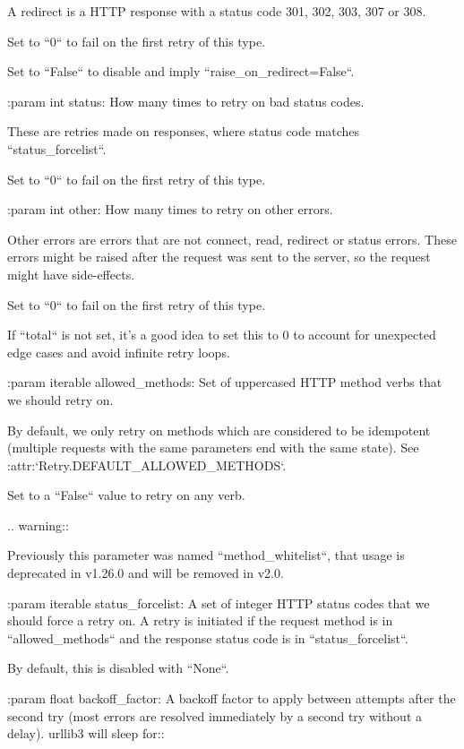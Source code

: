 \begin{DoxyVerb}
    A redirect is a HTTP response with a status code 301, 302, 303, 307 or
    308.

    Set to ``0`` to fail on the first retry of this type.

    Set to ``False`` to disable and imply ``raise_on_redirect=False``.

:param int status:
    How many times to retry on bad status codes.

    These are retries made on responses, where status code matches
    ``status_forcelist``.

    Set to ``0`` to fail on the first retry of this type.

:param int other:
    How many times to retry on other errors.

    Other errors are errors that are not connect, read, redirect or status errors.
    These errors might be raised after the request was sent to the server, so the
    request might have side-effects.

    Set to ``0`` to fail on the first retry of this type.

    If ``total`` is not set, it's a good idea to set this to 0 to account
    for unexpected edge cases and avoid infinite retry loops.

:param iterable allowed_methods:
    Set of uppercased HTTP method verbs that we should retry on.

    By default, we only retry on methods which are considered to be
    idempotent (multiple requests with the same parameters end with the
    same state). See :attr:`Retry.DEFAULT_ALLOWED_METHODS`.

    Set to a ``False`` value to retry on any verb.

    .. warning::

        Previously this parameter was named ``method_whitelist``, that
        usage is deprecated in v1.26.0 and will be removed in v2.0.

:param iterable status_forcelist:
    A set of integer HTTP status codes that we should force a retry on.
    A retry is initiated if the request method is in ``allowed_methods``
    and the response status code is in ``status_forcelist``.

    By default, this is disabled with ``None``.

:param float backoff_factor:
    A backoff factor to apply between attempts after the second try
    (most errors are resolved immediately by a second try without a
    delay). urllib3 will sleep for::


\end{DoxyVerb}
